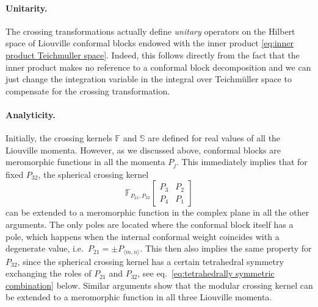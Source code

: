 \documentclass[12pt,a4paper]{article}
\newcommand{\be}{\begin{equation}}
\newcommand{\ee}{\end{equation}}
\begin{document}
\paragraph{Unitarity.} The crossing transformations actually define \emph{unitary} operators on the Hilbert space of Liouville conformal blocks endowed with the inner product \eqref{eq:inner product Teichmuller space}. Indeed, this follows directly from the fact that the inner product makes no reference to a conformal block decomposition and we can just change the integration variable in the integral over Teichm\"uller space to compensate for the crossing transformation.


\paragraph{Analyticity.} Initially, the crossing kernels $\mathbb{F}$ and $\mathbb{S}$ are defined for real values of all the Liouville momenta. However, as we discussed above, conformal blocks are meromorphic functions in all the momenta $P_j$. This immediately implies that for fixed $P_{32}$, the spherical crossing kernel
\be 
\mathbb{F}_{P_{21},P_{32}}\! \begin{bmatrix}
    P_3 & P_2 \\ P_4 & P_1
\end{bmatrix}
\ee
can be extended to a meromorphic function in the complex plane in all the other arguments. The only poles are located where the conformal block itself has a pole, which happens when the internal conformal weight coincides with a degenerate value, i.e.\ $P_{21}= \pm P_{\langle m,n \rangle}$. This then also implies the same property for $P_{32}$, since the spherical crossing kernel has a certain tetrahedral symmetry exchanging the roles of $P_{21}$ and $P_{32}$, see eq.~\eqref{eq:tetrahedrally symmetric combination} below. Similar arguments show that the modular crossing kernel can be extended to a meromorphic function in all three Liouville momenta.
\end{document}
